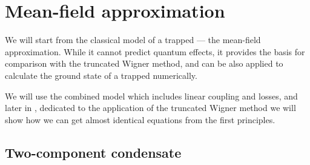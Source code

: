 \section{Mean-field approximation}
\label{sec:bec-noise:mean-field}

We will start from the classical model of a trapped  --- the mean-field approximation.
While it cannot predict quantum effects, it provides the basis for comparison with the truncated Wigner method, and can be also applied to calculate the ground state of a trapped  numerically.

We will use the combined model which includes linear coupling and losses, and later in , dedicated to the application of the truncated Wigner method we will show how we can get almost identical equations from the first principles.


\subsection{Two-component condensate}

